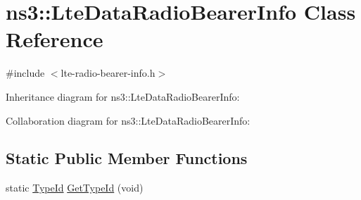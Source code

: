 \hypertarget{classns3_1_1LteDataRadioBearerInfo}{}\section{ns3\+:\+:Lte\+Data\+Radio\+Bearer\+Info Class Reference}
\label{classns3_1_1LteDataRadioBearerInfo}


{\ttfamily \#include $<$lte-\/radio-\/bearer-\/info.\+h$>$}



Inheritance diagram for ns3\+:\+:Lte\+Data\+Radio\+Bearer\+Info\+:


Collaboration diagram for ns3\+:\+:Lte\+Data\+Radio\+Bearer\+Info\+:
\subsection*{Static Public Member Functions}
\begin{DoxyCompactItemize}
\item 
static \hyperlink{classns3_1_1TypeId}{Type\+Id} \hyperlink{classns3_1_1LteDataRadioBearerInfo_a38639edc0aa2c128fd15825bdd9b5c54}{Get\+Type\+Id} (void)
\end{DoxyCompactItemize}
